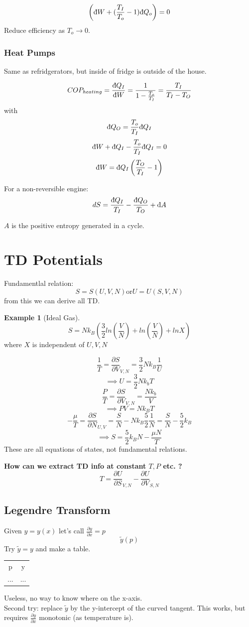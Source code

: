 \documentclass[11pt]{book}
\theoremstyle{definition}
\newtheorem{exm}{Example}[section]
\begin{document}
\[ \left( \text{\dj}W + (\frac{T_I}{T_o} - 1) \text{\dj}Q_o \right)  = 0\] 
Reduce efficiency as $T_o \to 0$.

\subsubsection{Heat Pumps}%
\label{ssub:Heat Pumps}
Same as refridgerators, but inside of fridge is outside of the house.

\[ COP_{heating} = \frac{ \text{\dj}Q_I }{ \text{\dj}W } = \frac{1}{1-\frac{T_o}{T_I}} = \frac{T_I}{T_I-T_O} \] 
with \[ \text{\dj}Q_O = \frac{T_o}{T_I} \text{\dj}Q_I \] 
\[ \text{\dj}W + \text{\dj} Q_I - \frac{T_o}{T_I} \text{\dj}Q_I = 0 \] 
\[ \text{\dj}W = \text{\dj}Q_I \left( \frac{T_O}{T_I} - 1 \right)  \] 

For a non-reversible engine:
\[ dS =\frac{ \text{\dj}Q_I}{T_I} - \frac{ \text{\dj}Q_O}{T_O} + \text{\dj}A \] 

$ A $ is the positive entropy generated in a cycle.

\section{TD Potentials}
Fundamentlal relation:
\[ S=S(U,V,N) \text{or} U=U(S,V,N) \] 
from this we can derive all TD.

\begin{exm}[Ideal Gas]
	\[ S = Nk_B\left( \frac{3}{2}ln(\frac{V}{N}) + ln (\frac{V}{N}) + ln X \right)  \] 
	where $ X $ is independent of $ U,V,N $ 
	
	\[ \frac{1}{T} = \frac{\partial S}{\partial V}_{V,N} = \frac{3}{2}Nk_B \frac{1}{U} \] 
	\[ \implies U = \frac{3}{2}Nk_bT \] 
	\[ \frac{P}{T} = \frac{\partial S}{\partial V}_{V,N} = \frac{Nk_b}{V} \] 
	\[ \implies PV = Nk_BT \] 
	\[ -\frac{\mu}{T} = \frac{\partial S}{\partial N}_{U,V} = \frac{S}{N} - Nk_B \frac{5}{2}\frac{1}{N} = \frac{S}{N}-\frac{5}{2}k_B\] 
	\[ \implies S = \frac{5}{2}k_BN - \frac{\mu N}{T} \] 
	These are all equations of states, not fundamental relations.
\end{exm}
	
\textbf{How can we extract TD info at constant $ T,P $ etc. ?} 
\[ T = \frac{\partial U}{\partial S}_{V,N} - \frac{\partial U}{\partial V}_{S,N}\] 

\subsection{Legendre Transform}
Given $ y = y(x) $ let's call $ \frac{\partial y}{\partial x} = p $ 
\[ \tilde y(p) \] 
Try $ \tilde y = y $ and make a table. \\
\begin{table}[htpb]
	\centering
	\begin{tabular}{c c}
		p & y \\
		... & ...
	\end{tabular}
\end{table}
Useless, no way to know where on the x-axis.\\
Second try: replace $ \tilde y $ by the y-intercept of the curved tangent.
This works, but requires $ \frac{\partial y}{\partial x} $ monotonic (as temperature is).
\end{document}
